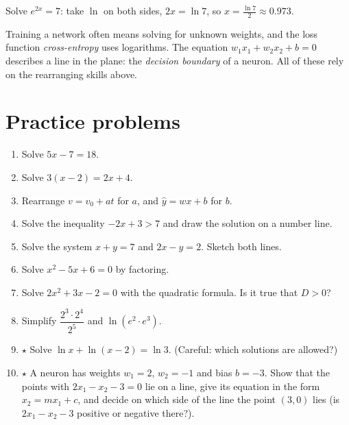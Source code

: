 \begin{example}
Solve $e^{2x}=7$: take $\ln$ on both sides, $2x=\ln7$, so $x=\frac{\ln7}{2}\approx0.973$.
\end{example}

\begin{aibox}
Training a network often means solving for unknown weights, and the loss function \emph{cross-entropy} uses logarithms. The equation $w_1x_1+w_2x_2+b=0$ describes a line in the plane: the \emph{decision boundary} of a neuron. All of these rely on the rearranging skills above.
\end{aibox}

\section*{Practice problems}
\begin{enumerate}[label=\textbf{\thechapter.\arabic*}]
  \item Solve $5x-7=18$.
  \item Solve $3(x-2)=2x+4$.
  \item Rearrange $v=v_0+at$ for $a$, and $\hat y=wx+b$ for $b$.
  \item Solve the inequality $-2x+3>7$ and draw the solution on a number line.
  \item Solve the system $x+y=7$ and $2x-y=2$. Sketch both lines.
  \item Solve $x^2-5x+6=0$ by factoring.
  \item Solve $2x^2+3x-2=0$ with the quadratic formula. Is it true that $D>0$?
  \item Simplify $\dfrac{2^3\cdot2^4}{2^5}$ and $\ln(e^2\cdot e^3)$.
  \item $\star$ Solve $\ln x+\ln(x-2)=\ln3$. (Careful: which solutions are allowed?)
  \item $\star$ A neuron has weights $w_1=2$, $w_2=-1$ and bias $b=-3$. Show that the points with $2x_1-x_2-3=0$ lie on a line, give its equation in the form $x_2=mx_1+c$, and decide on which side of the line the point $(3,0)$ lies (is $2x_1-x_2-3$ positive or negative there?).
\end{enumerate}

